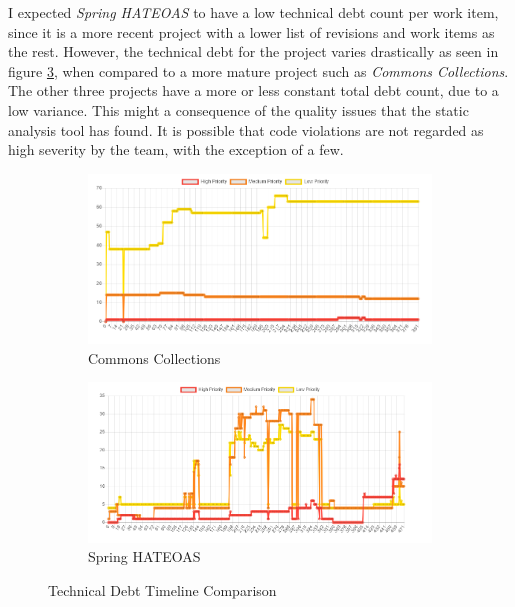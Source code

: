 \documentclass{mpaper}
\begin{document}
I expected \emph{Spring HATEOAS} to have a low technical debt count per work
item, since it is a more recent project with a lower list of revisions and work
items as the rest. However, the technical debt for the project varies
drastically as seen in figure \ref{fig:td-timeline}, when compared to a more
mature project such as \emph{Commons Collections}. The other three projects have
a more or less constant total debt count, due to a low variance. This might a
consequence of the quality issues that the static analysis tool has found. It is
possible that code violations are not regarded as high severity by the team,
with the exception of a few. 

\begin{figure}
	\centering
	\begin{subfigure}{.45\textwidth}
		\includegraphics[width=\linewidth]{images/collections_td_timeline.png}
		\caption{Commons Collections}
		\label{fig:collections-td-timeline}
	\end{subfigure}
	\begin{subfigure}{.45\textwidth}
		\includegraphics[width=\linewidth]{images/spring_td_timeline.png}
		\caption{Spring HATEOAS}
		\label{fig:spring-td-timeline}
	\end{subfigure}
	\caption{Technical Debt Timeline Comparison}
	\label{fig:td-timeline}
\end{figure}
\end{document}
